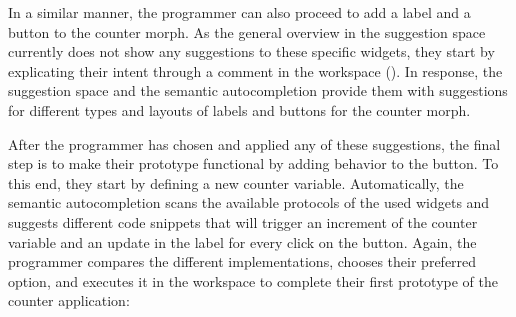 In a similar manner, the programmer can also proceed to add a label and a button to the counter morph.
As the general overview in the suggestion space currently does not show any suggestions to these specific widgets, they start by explicating their intent through a comment in the workspace ().
In response, the suggestion space and the semantic autocompletion provide them with suggestions for different types and layouts of labels and buttons for the counter morph.

After the programmer has chosen and applied any of these suggestions, the final step is to make their prototype functional by adding behavior to the button.
To this end, they start by defining a new counter variable.
Automatically, the semantic autocompletion scans the available protocols of the used widgets and suggests different code snippets that will trigger an increment of the counter variable and an update in the label for every click on the button.
Again, the programmer compares the different implementations, chooses their preferred option, and executes it in the workspace to complete their first prototype of the counter application:

